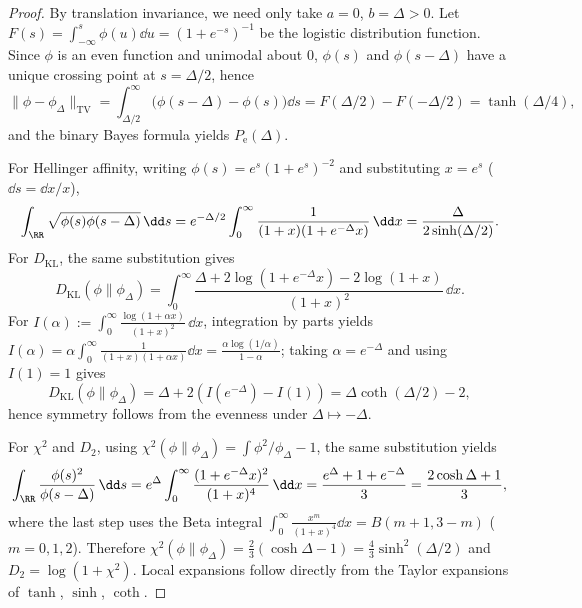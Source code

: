 \begin{proof}
By translation invariance, we need only take \(a=0\), \(b=\Delta>0\).
Let \(F(s)=\int_{-\infty}^{s}\phi(u)\dd u=(1+e^{-s})^{-1}\) be the logistic distribution function.
Since \(\phi\) is an even function and unimodal about \(0\), \(\phi(s)\) and \(\phi(s-\Delta)\) have a unique crossing point at \(s=\Delta/2\), hence
\[
\|\phi-\phi_{\Delta}\|_{\mathrm{TV}}
=\int_{\Delta/2}^{\infty}\bigl(\phi(s-\Delta)-\phi(s)\bigr)\dd s
=F(\Delta/2)-F(-\Delta/2)
=\tanh(\Delta/4),
\]
and the binary Bayes formula yields \(P_{\mathrm e}(\Delta)\).
\par
For Hellinger affinity, writing \(\phi(s)=e^{s}(1+e^{s})^{-2}\) and substituting \(x=e^{s}\) (\(\dd s=\dd x/x\)),
\[
\int_{\RR}\sqrt{\phi(s)\phi(s-\Delta)}\,\dd s
=e^{-\Delta/2}\int_{0}^{\infty}\frac{1}{(1+x)(1+e^{-\Delta}x)}\,\dd x
=\frac{\Delta}{2\sinh(\Delta/2)}.
\]
For \(D_{\mathrm{KL}}\), the same substitution gives
\[
D_{\mathrm{KL}}(\phi\|\phi_{\Delta})
=\int_{0}^{\infty}\frac{\Delta+2\log(1+e^{-\Delta}x)-2\log(1+x)}{(1+x)^{2}}\,\dd x.
\]
For
\(
I(\alpha):=\int_{0}^{\infty}\frac{\log(1+\alpha x)}{(1+x)^{2}}\,\dd x
\),
integration by parts yields
\(
I(\alpha)=\alpha\int_{0}^{\infty}\frac{1}{(1+x)(1+\alpha x)}\dd x
=\frac{\alpha\log(1/\alpha)}{1-\alpha}
\);
taking \(\alpha=e^{-\Delta}\) and using \(I(1)=1\) gives
\[
D_{\mathrm{KL}}(\phi\|\phi_{\Delta})
=\Delta+2(I(e^{-\Delta})-I(1))
=\Delta\coth(\Delta/2)-2,
\]
hence symmetry follows from the evenness under \(\Delta\mapsto-\Delta\).
\par
For \(\chi^2\) and \(D_2\), using
\(
\chi^2(\phi\|\phi_{\Delta})=\int \phi^2/\phi_{\Delta}-1
\),
the same substitution yields
\[
\int_{\RR}\frac{\phi(s)^2}{\phi(s-\Delta)}\,\dd s
=e^{\Delta}\int_{0}^{\infty}\frac{(1+e^{-\Delta}x)^{2}}{(1+x)^{4}}\,\dd x
=\frac{e^{\Delta}+1+e^{-\Delta}}{3}
=\frac{2\cosh\Delta+1}{3},
\]
where the last step uses the Beta integral
\(
\int_{0}^{\infty}\frac{x^{m}}{(1+x)^{4}}\dd x=B(m+1,3-m)
\)
(\(m=0,1,2\)).
Therefore
\(
\chi^2(\phi\|\phi_{\Delta})=\frac{2}{3}(\cosh\Delta-1)=\frac{4}{3}\sinh^{2}(\Delta/2)
\)
and \(D_2=\log(1+\chi^2)\).
Local expansions follow directly from the Taylor expansions of \(\tanh\), \(\sinh\), \(\coth\).
\end{proof}


